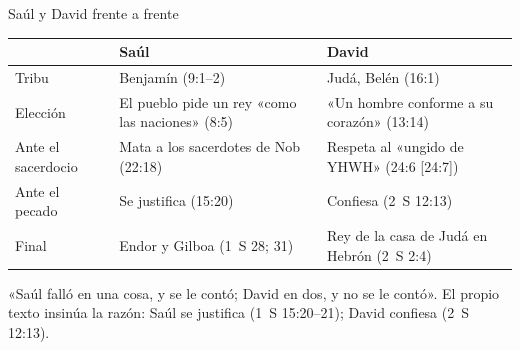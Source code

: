 \begin{frame}{Saúl y David frente a frente}
\centering\footnotesize\renewcommand{\arraystretch}{1.25}
\begin{tabular}{>{\RaggedRight\arraybackslash}p{2.4cm}>{\RaggedRight\arraybackslash}p{4.6cm}>{\RaggedRight\arraybackslash}p{4.6cm}}
\toprule
& {\color{ladrillo}\bfseries Saúl} & {\color{ladrillo}\bfseries David}\\\midrule
Tribu & Benjamín (9:1--2) & Judá, Belén (16:1)\\
Elección & El pueblo pide un rey «como las naciones» (8:5) & «Un hombre conforme a su corazón» (13:14)\\
Ante el sacerdocio & Mata a los sacerdotes de Nob (22:18) & Respeta al «ungido de YHWH» (24:6 [24:7])\\
Ante el pecado & Se justifica (15:20) & Confiesa (2~S 12:13)\\
Final & Endor y Gilboa (1~S 28; 31) & Rey de la casa de Judá en Hebrón (2~S 2:4)\\
\bottomrule
\end{tabular}
\vspace{6pt}
\begin{notalam}
«Saúl falló en una cosa, y se le contó; David en dos, y no se le contó». El propio texto insinúa la razón: Saúl se justifica (1~S 15:20--21); David confiesa (2~S 12:13).
\end{notalam}
\end{frame}

